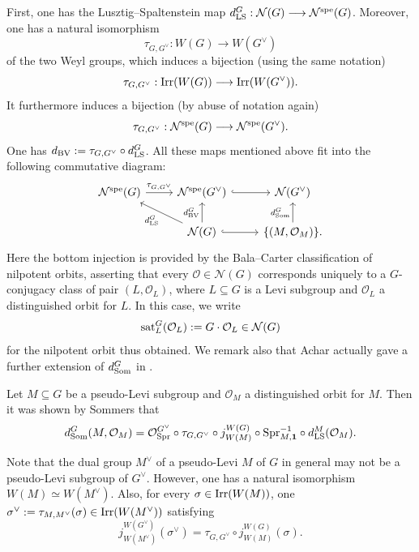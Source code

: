 \documentclass[reqno,12pt]{amsart}
\numberwithin{equation}{section}
\theoremstyle{plain}
\theoremstyle{definition}
\renewcommand{\subset}{\subseteq}
\begin{document}
First, one has the Lusztig--Spaltenstein map $d_{\rm LS}^G: \mathcal{N}(G) \longrightarrow \mathcal{N}^{\rm spe}(G)$. Moreover, one has a natural isomorphism 
$$\tau_{G, G^\vee}: W(G) \longrightarrow W(G^\vee)$$
of the two Weyl groups, which induces a bijection (using the same notation)
$$\tau_{G, G^\vee}: {\rm Irr}(W(G)) \longrightarrow {\rm Irr}(W(G^\vee)).$$
It furthermore induces a bijection (by abuse of notation again)
$$\tau_{G, G^\vee}: \mathcal{N}^{\rm spe}(G) \longrightarrow \mathcal{N}^{\rm spe}(G^\vee).$$
One has $d_{\rm BV}:= \tau_{G, G^\vee} \circ d_{\rm LS}^G$. All these maps mentioned above fit into the following commutative diagram:
$$\begin{tikzcd}
\mathcal{N}^{\rm spe}(G) \ar[r, "{\tau_{G,G^\vee}}"] & \mathcal{N}^{\rm spe}(G^\vee)  \ar[r, hook] & \mathcal{N}(G^\vee) \\
& \mathcal{N}(G) \ar[lu, "{d_{\rm LS}^G}"] \ar[u, "{d_{\rm BV}^G}"] \ar[r, hook] & {\{(M, \mathcal{O}_M) \} } \ar[u, "{d_{\rm Som}^G}"] .
\end{tikzcd}
$$
Here the bottom injection is provided by the Bala--Carter classification of nilpotent orbits, asserting that every $\mathcal{O} \in \mathcal{N}(G)$ corresponds uniquely to a $G$-conjugacy class of pair $(L, \mathcal{O}_L)$, where $L \subseteq G$ is a Levi subgroup and $\mathcal{O}_L$ a distinguished orbit for $L$. In this case, we write
$${\rm sat}_L^G(\mathcal{O}_L):= G \cdot \mathcal{O}_L \in \mathcal{N}(G)$$ for the nilpotent orbit thus obtained. We remark also that Achar actually gave a further extension of $d_{\rm Som}^G$ in \cite{ac03}.


Let $M \subset G$ be a pseudo-Levi subgroup and $\mathcal{O}_{M}$ a distinguished orbit for $M$. Then it was shown by Sommers \cite[\S 6]{Sommers} that 
\begin{equation} \label{E:dSom}
d_{\rm Som}^{G}(M, \mathcal{O}_{M}) = \mathcal{O}_{\rm Spr}^{G^\vee} \circ \tau_{G, G^\vee} \circ j_{W(M)}^{W(G)} \circ {\rm Spr}_{M, \mathbf{1}}^{-1} \circ d_{\rm LS}^{M}(\mathcal{O}_{M}).
\end{equation}

Note that the dual group $M^\vee$ of a pseudo-Levi $M$ of $G$ in general may not be a pseudo-Levi subgroup of $G^\vee$. However, one has a natural isomorphism $W(M) \simeq W(M^\vee)$. Also, for every $\sigma \in {\rm Irr}(W(M))$, one  $\sigma^\vee:= \tau_{M, M^\vee}(\sigma) \in {\rm Irr}(W(M^\vee))$ satisfying  
\begin{equation} \label{E:transp}
j_{W(M^\vee)}^{W(G^\vee)} (\sigma^\vee) = \tau_{G, G^\vee} \circ j_{W(M)}^{W(G)} (\sigma).
\end{equation}
\end{document}
